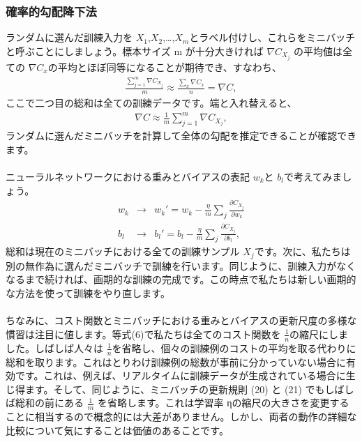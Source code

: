 \documentclass[11pt,a4paper,fleqn]{jsarticle}
\begin{document}
\subsubsection{確率的勾配降下法}
ランダムに選んだ訓練入力を $X_1$,$X_2$,…,$X_m$とラベル付けし、これらを{\gt \large ミニバッチ}と呼ぶことにしましょう。標本サイズ m が十分大きければ $\nabla C_{X_j}$ の平均値は全ての $\nabla C_x$の平均とほぼ同等になることが期待でき、すなわち、
\begin{eqnarray}
  \frac{\sum_{j=1}^m \nabla C_{X_{j}}}{m} \approx \frac{\sum_x \nabla C_x}{n} = \nabla C,
\end{eqnarray}
ここで二つ目の総和は全ての訓練データです。端と入れ替えると、
\begin{eqnarray}
  \nabla C \approx \frac{1}{m} \sum_{j=1}^m \nabla C_{X_{j}},
\end{eqnarray}
ランダムに選んだミニバッチを計算して全体の勾配を推定できることが確認できます。\\
\\
ニューラルネットワークにおける重みとバイアスの表記 $w_k$と $b_l$で考えてみましょう。
\begin{eqnarray}
  w_k & \rightarrow & w_k' = w_k-\frac{\eta}{m}
  \sum_j \frac{\partial C_{X_j}}{\partial w_k} \\
  b_l & \rightarrow & b_l' = b_l-\frac{\eta}{m}
  \sum_j \frac{\partial C_{X_j}}{\partial b_l},
\end{eqnarray}
総和は現在のミニバッチにおける全ての訓練サンプル $X_j$です。次に、私たちは別の無作為に選んだミニバッチで訓練を行います。同じように、訓練入力がなくなるまで続ければ、画期的な訓練の完成です。この時点で私たちは新しい画期的な方法を使って訓練をやり直します。\\
\\
ちなみに、コスト関数とミニバッチにおける重みとバイアスの更新尺度の多様な慣習は注目に値します。等式(6)で私たちは全てのコスト関数を $\frac{1}{n}$の縮尺にしました。しばしば人々は $\frac{1}{n}$を省略し、個々の訓練例のコストの平均を取る代わりに総和を取ります。これはとりわけ訓練例の総数が事前に分かっていない場合に有効です。これは、例えば、リアルタイムに訓練データが生成されている場合に生じ得ます。そして、同じように、ミニバッチの更新規則 (20) と (21) でもしばしば総和の前にある $\frac{1}{m}$ を省略します。これは学習率 ηの縮尺の大きさを変更することに相当するので概念的には大差がありません。しかし、両者の動作の詳細な比較について気にすることは価値のあることです。
\end{document}
